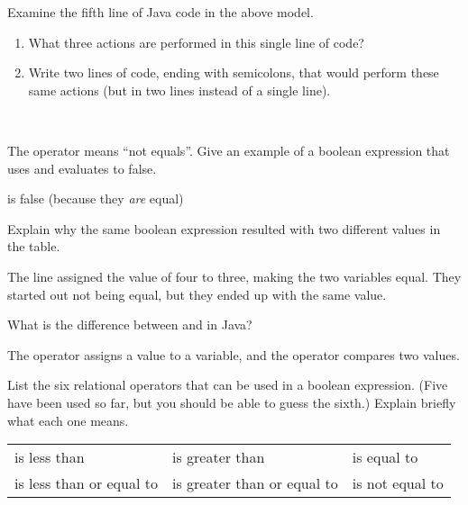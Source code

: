 \Q Examine the fifth line of Java code in the above model.

\begin{enumerate}

\item What three actions are performed in this single line of code?

\item Write two lines of code, ending with semicolons, that would perform these same actions (but in two lines instead of a single line).

 \\

\end{enumerate}


\Q The \java{!=} operator means ``not equals''.
Give an example of a boolean expression that uses \java{!=} and evaluates to false.

\begin{answer}[3em]
 is false (because they \emph{are} equal)
\end{answer}


\Q Explain why the same boolean expression  resulted with two different values in the table.

\begin{answer}
The line  assigned the value of four to three, making the two variables equal.
They started out not being equal, but they ended up with the same value.
\end{answer}


\Q What is the difference between \java{=} and \java{==} in Java?

\begin{answer}
The \java{=} operator assigns a value to a variable, and the \java{==} operator compares two values.
\end{answer}


\Q List the six relational operators that can be used in a boolean expression.
(Five have been used so far, but you should be able to guess the sixth.)
Explain briefly what each one means.

\begin{answer}
\begin{tabular}{lll}
\java{<} is less than              & \java{>} is greater than              & \java{==} is equal to     \\
\java{<=} is less than or equal to & \java{>=} is greater than or equal to & \java{!=} is not equal to \\
\end{tabular}
\end{answer}
